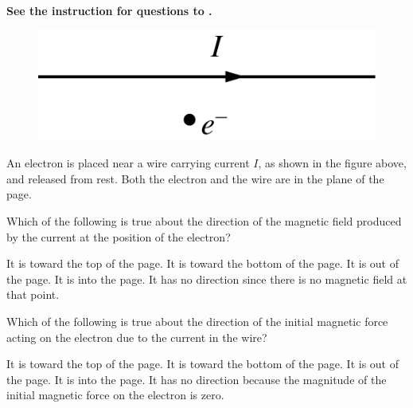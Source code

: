 \textbf{See the instruction for questions  to .}

\begin{figure}[H]
    \centering
    \includegraphics[scale=0.3]{images/img-009-016.png}
\end{figure}

An electron is placed near a wire carrying current $I$, as shown in the figure above, and released from rest. Both the electron and the wire are in the plane of the page.

\begin{questions}\setcounter{question}{17}\question
Which of the following is true about the direction of the magnetic field produced by the current at the position of the electron?

\begin{choices}
\choice It is toward the top of the page.
\choice It is toward the bottom of the page.
\choice It is out of the page.
\choice It is into the page.
\choice It has no direction since there is no magnetic field at that point.
\end{choices}\end{questions}

\begin{questions}\setcounter{question}{18}\question
Which of the following is true about the direction of the initial magnetic force acting on the electron due to the current in the wire?

\begin{choices}
\choice It is toward the top of the page.
\choice It is toward the bottom of the page.
\choice It is out of the page.
\choice It is into the page.
\choice It has no direction because the magnitude of the initial magnetic force on the electron is zero.
\end{choices}\end{questions}

